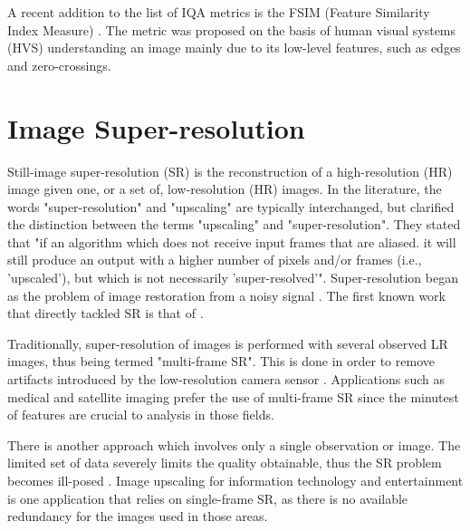 A recent addition to the list of IQA metrics is the FSIM (Feature Similarity Index Measure) \citep{Zhang2011a}.
The metric was proposed on the basis of human visual systems (HVS) understanding an image mainly due to its low-level features, such as edges and zero-crossings.


\section{Image Super-resolution}

Still-image super-resolution (SR) is the reconstruction of a high-resolution (HR) image given one, or a set of, low-resolution (HR) images. 
In the literature, the words "super-resolution" and "upscaling" are typically interchanged, but \cite{Takeda2009} clarified the distinction between the terms "upscaling" and "super-resolution". 
They stated that "if an algorithm which does not receive input frames that are aliased. it will still produce an output with a higher number of pixels and/or frames (i.e., 'upscaled'), but which is not necessarily 'super-resolved'".
Super-resolution began as the problem of image restoration from a noisy signal \citep{Helstrom1967}.
The first known work that directly tackled SR is that of \cite{tsai1984multiframe}. 

Traditionally, super-resolution of images is performed with several observed LR images, thus being termed "multi-frame SR". 
This is done in order to remove artifacts introduced by the low-resolution camera sensor \citep{Yang2010a}. 
Applications such as medical and satellite imaging prefer the use of multi-frame SR since the minutest of features are crucial to analysis in those fields.

There is another approach which involves only a single observation or image.
The limited set of data severely limits the quality obtainable, thus 
the SR problem becomes ill-posed \citep{Yang2010a}.
Image upscaling for information technology and entertainment is one application that relies on single-frame SR, as there is no available redundancy for the images used in those areas.

